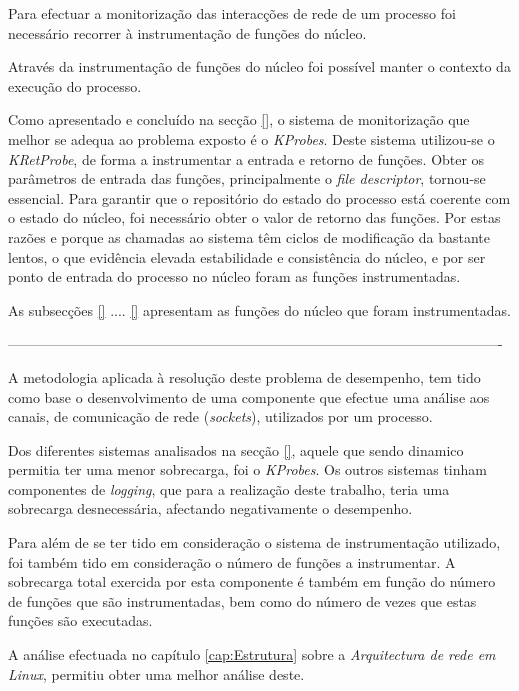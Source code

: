 Para efectuar a monitorização das interacções de rede de um processo foi necessário recorrer à instrumentação de funções do núcleo.

Através da instrumentação de funções do núcleo foi possível manter o contexto da execução do processo.

Como apresentado e concluído na secção \ref{}, o sistema de monitorização que melhor se adequa ao problema exposto é o \textit{KProbes}.
 Deste sistema utilizou-se o \textit{KRetProbe}, de forma a instrumentar a entrada e retorno de funções.
 Obter os parâmetros de entrada das funções, principalmente o \textit{file descriptor}, tornou-se essencial.
 Para garantir que o repositório do estado do processo está coerente com o estado do núcleo, foi necessário obter o valor de retorno das funções.
 Por estas razões e porque as chamadas ao sistema têm ciclos de modificação da bastante lentos, o que evidência elevada estabilidade e consistência do núcleo, e por ser ponto de entrada do processo no núcleo foram as funções instrumentadas.

As subsecções \ref{} .... \ref{} apresentam as funções do núcleo que foram instrumentadas.

%
%

----------------------------------------------------------------------------------------------------------

A metodologia aplicada à resolução deste problema de desempenho, tem tido como base o desenvolvimento de uma componente que efectue uma análise aos canais, de comunicação de rede (\textit{sockets}), utilizados por um processo.

Dos diferentes sistemas analisados na secção \ref{}, aquele que sendo dinamico permitia ter uma menor sobrecarga, foi o \textit{KProbes}.
Os outros sistemas tinham componentes de \textit{logging}, que para a realização deste trabalho, teria uma sobrecarga desnecessária, afectando negativamente o desempenho.

Para além de se ter tido em consideração o sistema de instrumentação utilizado, foi também tido em consideração o número de funções a instrumentar.
A sobrecarga total exercida por esta componente é também em função do número de funções que são instrumentadas, bem como do número de vezes que estas funções são executadas.

A análise efectuada no capítulo \ref{cap:Estrutura} sobre a \textit{Arquitectura de rede em Linux}, permitiu obter uma melhor análise deste.

